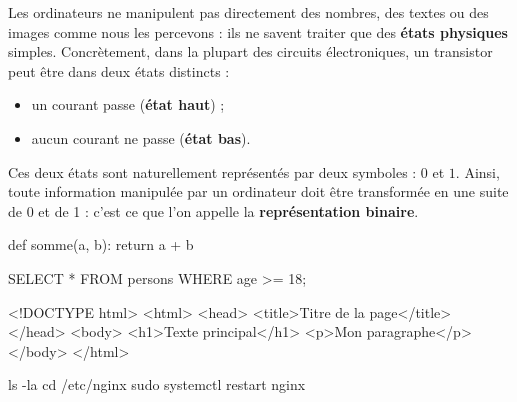 \documentclass[11pt]{exam}
\begin{document}
	\creerDoc
	
	
	
	Les ordinateurs ne manipulent pas directement des nombres, des textes ou des images comme nous les percevons : ils ne savent traiter que des \textbf{états physiques} simples.  
	Concrètement, dans la plupart des circuits électroniques, un transistor peut être dans deux états distincts :
	
	\begin{itemize}
		\item un courant passe (\textbf{état haut}) ;
		\item aucun courant ne passe (\textbf{état bas}).
	\end{itemize}
	
	Ces deux états sont naturellement représentés par deux symboles : \(0\) et \(1\).  
	Ainsi, toute information manipulée par un ordinateur doit être transformée en une suite de 0 et de 1 : c’est ce que l’on appelle la \textbf{représentation binaire}.
	

	
	
	
	
	

\begin{python}
	def somme(a, b):
		return a + b
\end{python}

\begin{sql}
	SELECT * FROM persons WHERE age >= 18;
\end{sql}

\begin{html}
	<!DOCTYPE html>
	<html>
	<head>
	<title>Titre de la page</title>
	</head>
	<body>
	<h1>Texte principal</h1>
	<p>Mon paragraphe</p>
	</body>
	</html>
\end{html}

\begin{bash}
	ls -la
	cd /etc/nginx
	sudo systemctl restart nginx
\end{bash}
\end{document}
